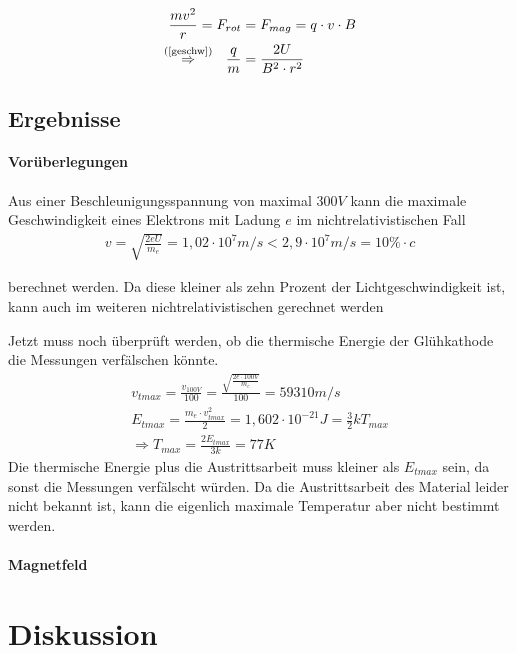 \documentclass[11pt, a4paper]{article}
\begin{document}
    \begin{align}{}
        \frac{mv^2}{r} = F_{rot} &= F_{mag} = q \cdot v \cdot B \\
        \overset{\text{(\ref{geschw})}}{\Rightarrow} \ \  \frac{q}{m} &= \frac{2U}{B^2 \cdot r^2} \\
    \end{align}

    \subsection{Ergebnisse}
    \paragraph{Vorüberlegungen}

    Aus einer Beschleunigungsspannung von maximal $300 \si{V}$ kann die maximale Geschwindigkeit eines Elektrons mit Ladung $e$ im nichtrelativistischen Fall
    \begin{align}
        v = \sqrt{\frac{2 e U}{m_e}} = 1,02 \cdot 10^{7} \si{m/s} < 2,9 \cdot 10^{7} \si{m/s} = 10\% \cdot c
    \end{align}

    berechnet werden. Da diese kleiner als zehn Prozent der Lichtgeschwindigkeit ist, kann auch im weiteren nichtrelativistischen gerechnet werden

    Jetzt muss noch überprüft werden, ob die thermische Energie der Glühkathode die Messungen verfälschen könnte.
    \begin{align}
        v_{tmax} = \frac{v_{100V}}{100} = \frac{\sqrt{\frac{2 e \cdot 100 \si{V}}{m_e}}}{100} = 59310 \si{m \per s} \\
        E_{tmax} = \frac{m_e \cdot v_{tmax}^2}{2} = 1,602 \cdot 10^{-21} \si{J} = \frac{3}{2} k T_{max} \\
        \Rightarrow T_{max} = \frac{2 E_{tmax}}{3 k} = 77K
    \end{align}
    Die thermische Energie plus die Austrittsarbeit muss kleiner als $E_{tmax}$ sein, da sonst die Messungen verfälscht würden. Da die Austrittsarbeit des Material leider nicht bekannt ist, kann die eigenlich maximale Temperatur aber nicht bestimmt werden.

    \paragraph{Magnetfeld}

    

    \section{Diskussion}

    
    
\end{document}
